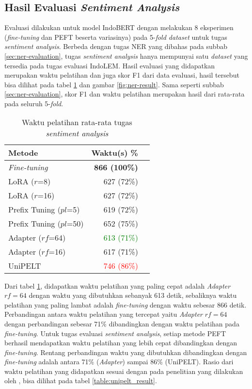 \subsection{Hasil Evaluasi \textit{Sentiment Analysis}}
\label{sec:sentiment-evaluation}

Evaluasi dilakukan untuk model IndoBERT dengan melakukan 8 eksperimen (\textit{fine-tuning} dan PEFT beserta variasinya) pada 5-\textit{fold dataset} untuk tugas \textit{sentiment analysis}. Berbeda dengan tugas NER yang dibahas pada subbab \ref{sec:ner-evaluation}, tugas \textit{sentiment analysis} hanya mempunyai satu \textit{dataset} yang tersedia pada tugas evaluasi IndoLEM. Hasil evaluasi yang didapatkan merupakan waktu pelatihan dan juga skor F1 dari data evaluasi, hasil tersebut bisa dilihat pada tabel \ref{table:runtime-sentiment} dan gambar \ref{fig:ner-result}. Sama seperti subbab \ref{sec:ner-evaluation}, skor F1 dan waktu pelatihan merupakan hasil dari rata-rata pada seluruh 5-\textit{fold}.

\begin{table}[h]
    \centering
    \caption{Waktu pelatihan rata-rata tugas \textit{sentiment analysis}}
    \label{table:runtime-sentiment}
    \begin{tabular}{l|rr}
        \toprule
        \textbf{Metode} & \textbf{Waktu(s) \%} \\
        \midrule
        \textit{Fine-tuning} & \textbf{866 (100\%)} \\
        LoRA ($r$=8) & 627 (72\%) \\
        LoRA ($r$=16) & 627 (72\%) \\
        Prefix Tuning ($pl$=5) & 619 (72\%) \\
        Prefix Tuning ($pl$=50) & 652 (75\%) \\
        Adapter ($rf$=64) & \textcolor{Green}{613 (71\%)} \\
        Adapter ($rf$=16) & 617 (71\%) \\
        UniPELT & \textcolor{Red}{746 (86\%)} \\
        \bottomrule
    \end{tabular}
\end{table}

Dari tabel \ref{table:runtime-sentiment}, didapatkan waktu pelatihan yang paling cepat adalah \textit{Adapter} $rf=64$ dengan waktu yang dibutuhkan sebanyak 613 detik, sebaliknya waktu pelatihan yang paling lambat adalah \textit{fine-tuning} dengan waktu sebesar 866 detik. Perbandingan antara waktu pelatihan yang tercepat yaitu \textit{Adapter} $rf=64$ dengan perbandingan sebesar 71\% dibandingkan dengan waktu pelatihan pada \textit{fine-tuning}. Untuk tugas evaluasi \textit{sentiment analysis}, setiap metode PEFT berhasil mendapatkan waktu pelatihan yang lebih cepat dibandingkan dengan \textit{fine-tuning}. Rentang perbandingan waktu yang dibutuhkan dibandingkan dengan \textit{fine-tuning} adalah antara 71\% (\textit{Adapter}) sampai 86\% (UniPELT). Rasio dari waktu pelatihan yang didapatkan sesuai dengan pada penelitian yang dilakukan oleh \citeauthor{unipelt}, bisa dilihat pada tabel \ref{table:unipelt_result}.

